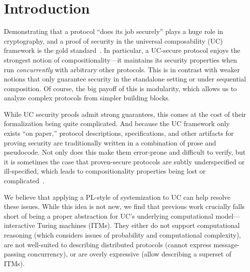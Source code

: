 \section{Introduction}
\label{sec:introduction}

Demonstrating that a protocol ``does its job securely'' plays a huge role in
cryptography, and a proof of security in the universal composability (UC)
framework is the gold standard~\cite{canetti2001universally}. In particular, a
UC-secure protocol enjoys the strongest notion of compositionality---it maintains
its security properties when run \emph{concurrently} with arbitrary other
protocols. This is in contrast with weaker notions that only guarantee security
in the standalone setting or under sequential composition. Of course, the big
payoff of this is modularity, which allows us to analyze complex protocols from
simpler building blocks.

\begin{comment}
In a nutshell, security proofs in UC follow the real/ideal
paradigm~\cite{goldreich1987play}. The security requirements of a given task are
defined as a program for a \emph{single trusted process} called an \emph{ideal
  functionality}, which runs in an imagined ideal world. This serves as a
specification of the desired security properties for a distributed protocol
achieving the task across \emph{many unstrusted processes}, which runs in the
real world. Roughly speaking, we say that a protocol $\pi$ \emph{emulates} an
ideal functionality $\mc{F}$ (i.e., it meets its specification) if every
adversarial behavior in the real world can also be exhibited in the ideal world.
\end{comment}

While UC security proofs admit strong guarantees, this comes at the cost of
their formalization being quite complicated. And because the UC framework only
exists ``on paper,'' protocol descriptions, specifications, and other artifacts
for proving security are traditionally written in a combination of prose and
pseudocode. Not only does this make them error-prone and difficult to verify,
but it is sometimes the case that proven-secure protocols are subtly
underspecified or ill-specified, which leads to compositionality properties
being lost or complicated~\cite{camenisch2016universal}.

We believe that applying a PL-style of systemization to UC can help resolve
these issues. While this idea is not new, we find that previous work crucially
falls short of being a proper abstraction for UC's underlying computational
model---interactive Turing machines (ITMs). They either do not support
computational reasoning (which considers issues of probability and computational
complexity), are not well-suited to describing distributed protocols (cannot
express message-passing concurrency), or are overly expressive (allow describing
a superset of ITMs).

